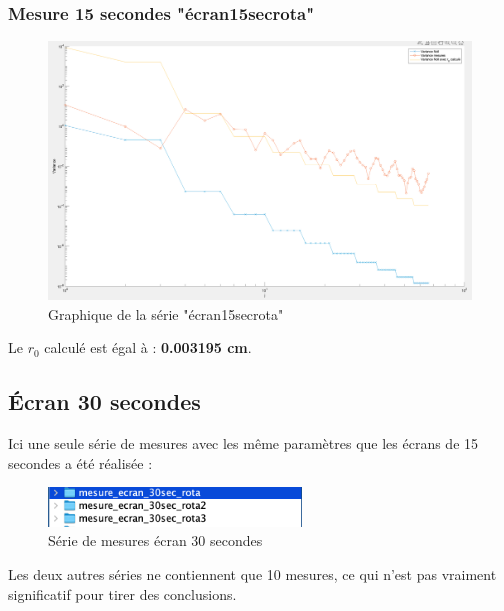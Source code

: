 \subsubsection{Mesure 15 secondes "écran\textunderscore15sec\textunderscore rota"}
\begin{figure}[H]
    \centering
    \includegraphics[width = \textwidth]{assets/figures/mesures/mesure_15_sec_rota_plot.png}
    \caption{Graphique de la série "écran\textunderscore15sec\textunderscore rota"}
\end{figure}
Le \textbf{$r_0$} calculé est égal à : \textbf{0.003195 cm}.

\subsection{Écran 30 secondes}
Ici une seule série de mesures avec les même paramètres que les écrans de 15 secondes a été réalisée :
\begin{figure}[H]
    \centering
    \includegraphics[width = 0.6\textwidth]{assets/figures/mesures/serie_mesures_30_sec_1.png}
    \caption{Série de mesures écran 30 secondes}
\end{figure}
Les deux autres séries ne contiennent que 10 mesures, ce qui n'est pas vraiment significatif pour tirer des conclusions.

